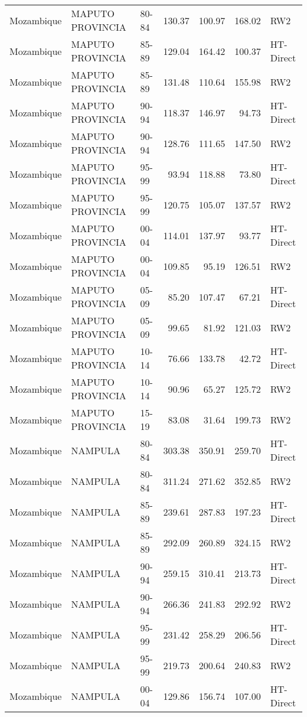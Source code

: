 \begin{longtable}{lllrrrl}
  Mozambique & MAPUTO PROVINCIA & 80-84 & 130.37 & 100.97 & 168.02 & RW2 \\ 
  Mozambique & MAPUTO PROVINCIA & 85-89 & 129.04 & 164.42 & 100.37 & HT-Direct \\ 
  Mozambique & MAPUTO PROVINCIA & 85-89 & 131.48 & 110.64 & 155.98 & RW2 \\ 
  Mozambique & MAPUTO PROVINCIA & 90-94 & 118.37 & 146.97 & 94.73 & HT-Direct \\ 
  Mozambique & MAPUTO PROVINCIA & 90-94 & 128.76 & 111.65 & 147.50 & RW2 \\ 
  Mozambique & MAPUTO PROVINCIA & 95-99 & 93.94 & 118.88 & 73.80 & HT-Direct \\ 
  Mozambique & MAPUTO PROVINCIA & 95-99 & 120.75 & 105.07 & 137.57 & RW2 \\ 
  Mozambique & MAPUTO PROVINCIA & 00-04 & 114.01 & 137.97 & 93.77 & HT-Direct \\ 
  Mozambique & MAPUTO PROVINCIA & 00-04 & 109.85 & 95.19 & 126.51 & RW2 \\ 
  Mozambique & MAPUTO PROVINCIA & 05-09 & 85.20 & 107.47 & 67.21 & HT-Direct \\ 
  Mozambique & MAPUTO PROVINCIA & 05-09 & 99.65 & 81.92 & 121.03 & RW2 \\ 
  Mozambique & MAPUTO PROVINCIA & 10-14 & 76.66 & 133.78 & 42.72 & HT-Direct \\ 
  Mozambique & MAPUTO PROVINCIA & 10-14 & 90.96 & 65.27 & 125.72 & RW2 \\ 
  Mozambique & MAPUTO PROVINCIA & 15-19 & 83.08 & 31.64 & 199.73 & RW2 \\ 
  Mozambique & NAMPULA & 80-84 & 303.38 & 350.91 & 259.70 & HT-Direct \\ 
  Mozambique & NAMPULA & 80-84 & 311.24 & 271.62 & 352.85 & RW2 \\ 
  Mozambique & NAMPULA & 85-89 & 239.61 & 287.83 & 197.23 & HT-Direct \\ 
  Mozambique & NAMPULA & 85-89 & 292.09 & 260.89 & 324.15 & RW2 \\ 
  Mozambique & NAMPULA & 90-94 & 259.15 & 310.41 & 213.73 & HT-Direct \\ 
  Mozambique & NAMPULA & 90-94 & 266.36 & 241.83 & 292.92 & RW2 \\ 
  Mozambique & NAMPULA & 95-99 & 231.42 & 258.29 & 206.56 & HT-Direct \\ 
  Mozambique & NAMPULA & 95-99 & 219.73 & 200.64 & 240.83 & RW2 \\ 
  Mozambique & NAMPULA & 00-04 & 129.86 & 156.74 & 107.00 & HT-Direct \\ 

\end{longtable}
